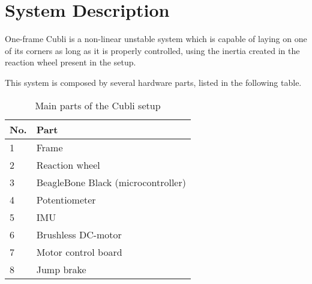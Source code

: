 \chapter{System Description}
One-frame Cubli is a non-linear unstable system which is capable of laying on one of its corners as long as it is properly controlled, using the inertia created in the reaction wheel present in the setup.

This system is composed by several hardware parts, listed in the following table. 

\begin{table}[H]
	\begin{tabular}{|l|p{6.7cm}|}
		\hline %
		\textbf{No.} &\textbf{Part} 			\\
		\hline %
		1            & Frame           			\\
		\hline %
		2            & Reaction wheel      		\\
		\hline %
		3            & BeagleBone Black (microcontroller)  \\
		\hline %
		4            & Potentiometer			\\
		\hline %
		5            & IMU          			\\
		\hline %
		6            & Brushless DC-motor   	\\
		\hline %
		7            & Motor control board     	\\
		\hline %
		8            & Jump brake		    	\\
		\hline %
	\end{tabular}
	\caption{Main parts of the Cubli setup}
\label{TableAAUCubliComponent}
\end{table}

